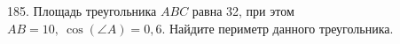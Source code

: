 185. Площадь треугольника $ABC$ равна 32, при этом $AB=10,\ \cos(\angle A)=0,6.$ Найдите периметр данного треугольника.\\
